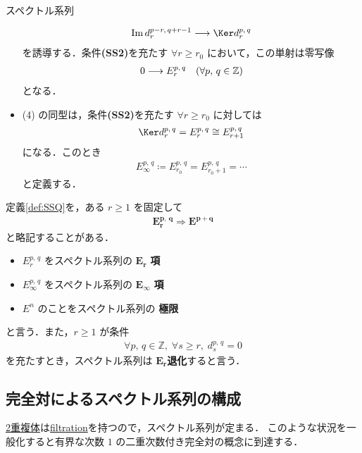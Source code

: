 \documentclass[algtopo_main]{subfiles}
\begin{document}
\begin{mydef}[label=def:SSQ, breakable]{スペクトル系列}
\begin{itemize}
\begin{align}
            \Im d_r^{p-r,\, q+r-1} \lto \Ker d_r^{p,\, q}
        \end{align}
        を誘導する．条件\textbf{(SS2)}を充たす $\forall r \ge r_0$ において，この単射は零写像
        \begin{align}
            0 \longrightarrow E_r^{p,\, q}\quad (\forall p,\, q\in \mathbb{Z})
        \end{align}
        となる．
        \item (4) の同型は，条件\textbf{(SS2)}を充たす $\forall r \ge r_0$ に対しては
        \begin{align}
            \Ker d_r^{p,\, q} = E_{r}^{p,\, q} \cong E_{r+1}^{p,\, q}
        \end{align}
        になる．このとき
        \begin{align}
            E_\infty^{p,\, q} \coloneqq E_{r_0}^{p,\, q} = E_{r_0 + 1}^{p,\, q} = \cdots 
        \end{align}
        と定義する．
    \end{itemize}
\end{mydef}

\begin{marker}
    定義\ref{def:SSQ}を，ある $r \ge 1$ を固定して
    \begin{align}
        \bm{E_{r}^{p,\, q} \Longrightarrow E^{p+q}}
    \end{align}
    と略記することがある．
\end{marker}

\begin{itemize}
    \item $E_r^{p,\, q}$ をスペクトル系列の $\bm{E_r}$ \textbf{項}
    \item $E_\infty^{p,\, q}$ をスペクトル系列の $\bm{E_\infty}$ \textbf{項}
    \item $E^n$ のことをスペクトル系列の \textbf{極限}
\end{itemize}
と言う．また，$r \ge 1$ が条件
\begin{align}
    \forall p,\,q \in \mathbb{Z},\; \forall s \ge r,\; d_{s}^{p,\, q} = 0
\end{align}
を充たすとき，スペクトル系列は $\bm{E_r}$\textbf{退化}すると言う．

\subsection{完全対によるスペクトル系列の構成}

\hyperref[def:double-complex]{2重複体}は\hyperref[def:filtration]{filtration}を持つので，スペクトル系列が定まる．
このような状況を一般化すると有界な次数 $1$ の二重次数付き完全対の概念に到達する．
\end{document}
